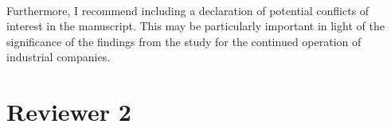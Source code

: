 \documentclass[a4paper,11pt]{article}
\theoremstyle{plain}
\begin{document}
{{    \textit{}

}

~\\[4ex]

Furthermore, I recommend including a declaration of potential conflicts of interest in
the manuscript. This may be particularly important in light of the significance of the
findings from the study for the continued operation of industrial companies.\\[2ex]


}

\clearpage
\section*{Reviewer 2}
\end{document}
